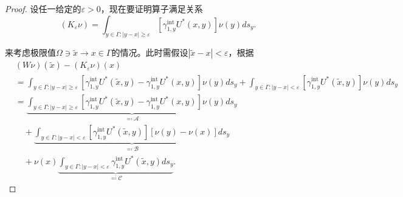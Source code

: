 \begin{proof}
设任一给定的$\varepsilon > 0$，现在要证明算子满足关系
\begin{equation*}
  \left( K_{\varepsilon} \nu \right)
  = \int_{y \in \Gamma: \left| y - x \right| \ge \varepsilon}
  \left[
  \gamma_{1,y}^{\text{int}}
  U^{*}(x,y)
  \right]
  \nu(y)
  d s_y.
\end{equation*}

来考虑极限值$\Omega \ni \widetilde{x} \rightarrow x \in \Gamma$的情况。此时需假设$\left| \widetilde{x} - x \right| < \varepsilon$，根据
\begin{equation*}
  \begin{split}
    &\left( W \nu \right)(\widetilde{x}) - \left( K_{\varepsilon} \nu \right)(x) \\
    &=
    \int_{y \in \Gamma: \left| y - x \right| \ge \varepsilon}
    \left[
    \gamma_{1,y}^{\text{int}}
    U^{*}(\widetilde{x},y)
    - \gamma_{1,y}^{\text{int}}
    U^{*}(x,y)
    \right]
    \nu(y)
    d s_y
    + \int_{y \in \Gamma: \left| y - x \right| < \varepsilon}
    \left[
    \gamma_{1,y}^{\text{int}}
    U^{*}(\widetilde{x},y)
    \right]
    \nu(y)
    d s_y \\
    & =
    \underbrace{
    \int_{y \in \Gamma: \left| y - x \right| \ge \varepsilon}
    \left[
    \gamma_{1,y}^{\text{int}}
    U^{*}(\widetilde{x},y)
    - \gamma_{1,y}^{\text{int}}
    U^{*}(x,y)
    \right]
    \nu(y)
    d s_y
    }_{\eqqcolon \mathcal{A}}
    \\
    & \quad +
    \underbrace{
    \int_{y \in \Gamma: \left| y - x \right| < \varepsilon}
    \left[
    \gamma_{1,y}^{\text{int}}
    U^{*}(\widetilde{x},y)
    \right]
    \left[
    \nu(y) - \nu(x)
    \right]
    d s_y
    }_{\eqqcolon \mathcal{B}}
     \\
    & \quad +
    \nu(x)
    \underbrace{
    \int_{y \in \Gamma: \left| y - x \right| < \varepsilon}
    \gamma_{1,y}^{\text{int}}
    U^{*}(\widetilde{x}, y)
    d s_y
    }_{\eqqcolon \mathcal{C}}.
  \end{split}
\end{equation*}


\end{proof}
